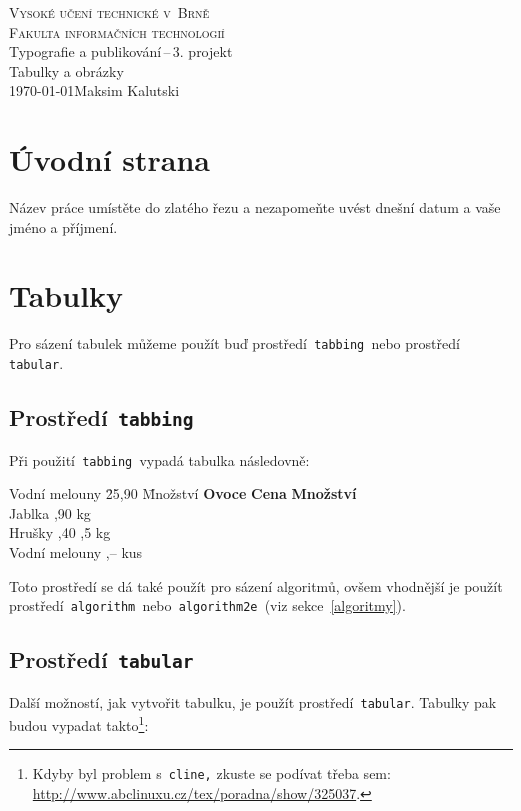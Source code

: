 \documentclass[a4paper, 11pt]{article}
\begin{document}
    \begin{titlepage}
        \begin{center}
            \Huge \textsc{Vysoké učení technické v~Brně} \\
            \huge \textsc{Fakulta informačních technologií} \\
            \LARGE Typografie a publikování\,--\,3. projekt \\
            \Huge Tabulky a obrázky \\
            {\Large \today \hfill Maksim Kalutski}
        \end{center}
    \end{titlepage}

\section{Úvodní strana}
Název práce umístěte do zlatého řezu a nezapomeňte uvést dnešní datum a vaše jméno a příjmení.

\section{Tabulky}
Pro sázení tabulek můžeme použít buď prostředí\texttt{ tabbing }nebo prostředí\texttt{ tabular}.

\subsection{Prostředí\texttt{ tabbing}}
Při použití\texttt{ tabbing }vypadá tabulka následovně:
\begin{tabbing}
    Vodní melouny \quad \= 25,90 \quad   \= Množství \kill
    \textbf{Ovoce}      \> \textbf{Cena} \> \textbf{Množství} \\
    Jablka              ,90          kg              \\
    Hrušky              ,40         ,5 kg            \\
    Vodní melouny       ,--          kus             \\
\end{tabbing}
Toto prostředí se dá také použít pro sázení algoritmů, ovšem vhodnější je použít prostředí\texttt{ algorithm }nebo\texttt{ algorithm2e }(viz sekce~\ref{algoritmy}).

\subsection{Prostředí\texttt{ tabular }}
Další možností, jak vytvořit tabulku, je použít prostředí\texttt{ tabular}. Tabulky pak budou vypadat takto\footnote{Kdyby byl problem s\texttt{ cline,} zkuste se podívat třeba sem: \href{http://www.abclinuxu.cz/tex/poradna/show/325037}{http://www.abclinuxu.cz/tex/poradna/show/325037}.}:
\end{document}
